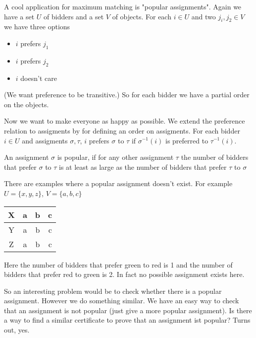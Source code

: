 A cool application for maximum matching is "popular assignments". Again we have a set $U$ of bidders and a set $V$ of objects. For each $i\in U$ and two $j_i,j_2\in V$ we have three options

\begin{itemize}
\item $i$ prefers $j_1$
\item $i$ prefers $j_2$
\item $i$ doesn't care
\end{itemize}

(We want preference to be transitive.) So for each bidder we have a partial order on the objects.

Now we want to make everyone as happy as possible. We extend the preference relation to assigments by for defining an order on assigments. For each bidder $i\in U$ and assigments $\sigma,\tau$, $i$ prefers $\sigma$ to $\tau$ if $\sigma^{-1}(i)$ is preferred to $\tau^{-1}(i)$.

\begin{Def} An assignment $\sigma$ is popular, if for any other assignment $\tau$ the number of bidders that prefer $\sigma$ to $\tau$ is at least as large as the number of bidders that prefer $\tau$ to $\sigma$
\end{Def}

There are examples where a popular assignment doesn't exist. For example $U=\{x,y,z\}$, $V = \{a,b,c\}$

\begin{center}
\begin{tabular}{c|ccc}
X & \cellcolor{gruen} a & b & \cellcolor{rot}c\\\hline
Y & a & \cellcolor{rot}b & \cellcolor{gruen}c\\\hline
Z & \cellcolor{rot}a & \cellcolor{gruen}b & c\\
\end{tabular}
\end{center}

Here the number of bidders that prefer green to red is 1 and the number of bidders that prefer red to green is 2. In fact no possible assignment exists here.

So an interesting problem would be to check whether there is a popular assignment. However we do something similar. We have an easy way to check that an assignment is not popular (just give a more popular assignment). Is there a way to find a similar certificate to prove that an assignment ist popular? Turns out, yes.

